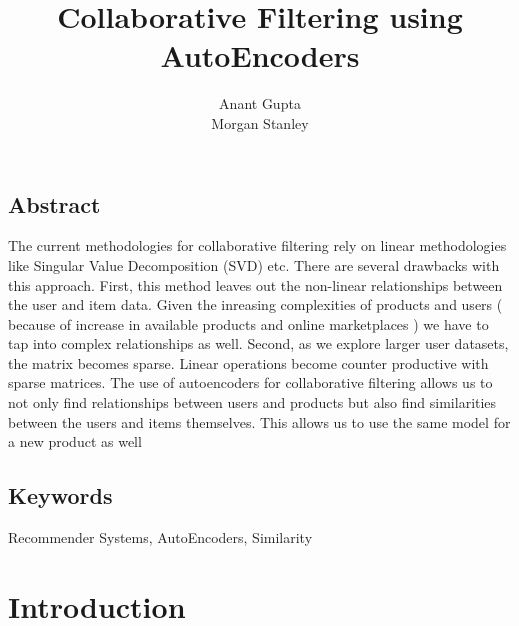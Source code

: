 \documentclass[letterpaper,twocolumn,10pt]{article}
\begin{document}

\graphicspath{ {/home/anantgupta/Documents/Competitions/ncmlai/} }

\date{}

\title{\Large \bf Collaborative Filtering using AutoEncoders}

\author{
{\rm Anant Gupta}\\
Morgan Stanley
} %

\maketitle

\thispagestyle{empty}


\subsection*{Abstract}
The current methodologies for collaborative filtering rely on linear methodologies like Singular Value Decomposition (SVD) etc. There are several drawbacks with this approach. First, this method leaves out the non-linear relationships between the user and item data. Given the inreasing complexities of products and users ( because of increase in available products and online marketplaces ) we
have to tap into complex relationships as well. Second, as we explore larger user datasets, the matrix becomes sparse. Linear operations become counter productive with sparse matrices. The use of autoencoders for collaborative filtering allows us to not only find relationships between 
users and products but also find similarities between the users and items themselves. This allows us to use the same model for a new product as well

\subsection*{Keywords}
Recommender Systems, AutoEncoders, Similarity

\section{Introduction}
\end{document}
